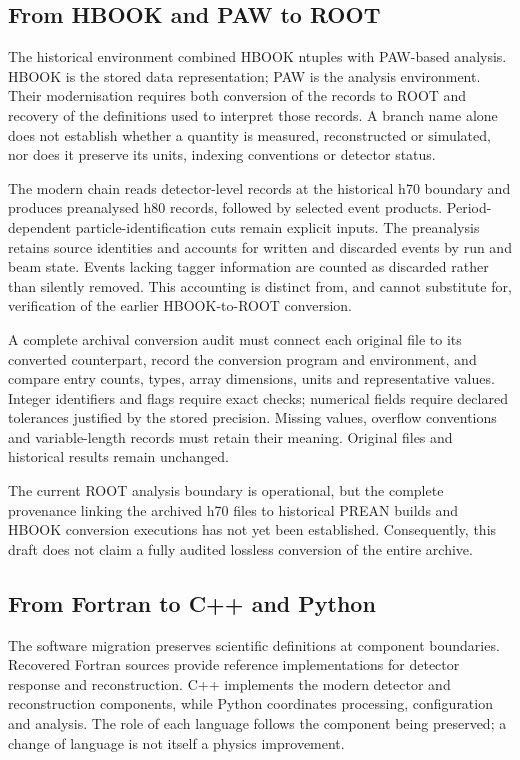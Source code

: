 \documentclass[10pt,aps,prd,amsmath,amssymb,superscriptaddress,twocolumn,nofootinbib,showpacs,showkeys,preprintnumbers,amsfonts,notitlepage,floatfix]{revtex4-2}
\begin{document}
\subsection{From HBOOK and PAW to ROOT}
The historical environment combined HBOOK ntuples with PAW-based analysis. HBOOK is the stored data representation; PAW is the analysis environment. Their modernisation requires both conversion of the records to ROOT \citep{Brun1997} and recovery of the definitions used to interpret those records. A branch name alone does not establish whether a quantity is measured, reconstructed or simulated, nor does it preserve its units, indexing conventions or detector status.

The modern chain reads detector-level records at the historical h70 boundary and produces preanalysed h80 records, followed by selected event products. Period-dependent particle-identification cuts remain explicit inputs. The preanalysis retains source identities and accounts for written and discarded events by run and beam state. Events lacking tagger information are counted as discarded rather than silently removed. This accounting is distinct from, and cannot substitute for, verification of the earlier HBOOK-to-ROOT conversion.

A complete archival conversion audit must connect each original file to its converted counterpart, record the conversion program and environment, and compare entry counts, types, array dimensions, units and representative values. Integer identifiers and flags require exact checks; numerical fields require declared tolerances justified by the stored precision. Missing values, overflow conventions and variable-length records must retain their meaning. Original files and historical results remain unchanged.

The current ROOT analysis boundary is operational, but the complete provenance linking the archived h70 files to historical PREAN builds and HBOOK conversion executions has not yet been established. Consequently, this draft does not claim a fully audited lossless conversion of the entire archive.

\subsection{From Fortran to C++ and Python}
The software migration preserves scientific definitions at component boundaries. Recovered Fortran sources provide reference implementations for detector response and reconstruction. C++ implements the modern detector and reconstruction components, while Python coordinates processing, configuration and analysis. The role of each language follows the component being preserved; a change of language is not itself a physics improvement.
\end{document}
